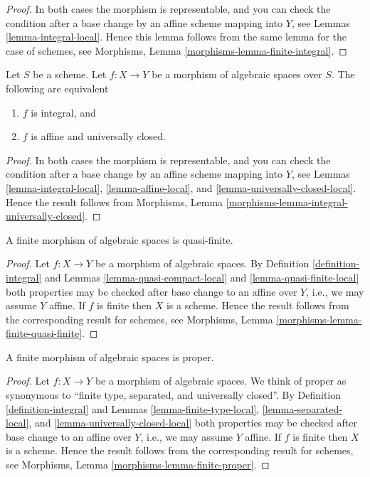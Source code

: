 \begin{proof}
In both cases the morphism is representable, and you can check the condition
after a base change by an affine scheme mapping into $Y$, see
Lemmas \ref{lemma-integral-local}. Hence this lemma follows from the
same lemma for the case of schemes, see
Morphisms, Lemma \ref{morphisms-lemma-finite-integral}.
\end{proof}

\begin{lemma}
\label{lemma-integral-universally-closed}
Let $S$ be a scheme.
Let $f : X \to Y$ be a morphism of algebraic spaces over $S$.
The following are equivalent
\begin{enumerate}
\item $f$ is integral, and
\item $f$ is affine and universally closed.
\end{enumerate}
\end{lemma}

\begin{proof}
In both cases the morphism is representable, and you can check the condition
after a base change by an affine scheme mapping into $Y$, see
Lemmas \ref{lemma-integral-local},
\ref{lemma-affine-local}, and
\ref{lemma-universally-closed-local}.
Hence the result follows from
Morphisms, Lemma \ref{morphisms-lemma-integral-universally-closed}.
\end{proof}

\begin{lemma}
\label{lemma-finite-quasi-finite}
A finite morphism of algebraic spaces is quasi-finite.
\end{lemma}

\begin{proof}
Let $f : X \to Y$ be a morphism of algebraic spaces.
By
Definition \ref{definition-integral}
and
Lemmas \ref{lemma-quasi-compact-local} and
\ref{lemma-quasi-finite-local}
both properties may be checked after base change to an affine over $Y$,
i.e., we may assume $Y$ affine.
If $f$ is finite then $X$ is a scheme.
Hence the result follows from the corresponding result for schemes, see
Morphisms, Lemma \ref{morphisms-lemma-finite-quasi-finite}.
\end{proof}

\begin{lemma}
\label{lemma-finite-proper}
A finite morphism of algebraic spaces is proper.
\end{lemma}

\begin{proof}
Let $f : X \to Y$ be a morphism of algebraic spaces.
We think of proper as synonymous to
``finite type, separated, and universally closed''.
By
Definition \ref{definition-integral}
and
Lemmas \ref{lemma-finite-type-local},
\ref{lemma-separated-local}, and
\ref{lemma-universally-closed-local}
both properties may be checked after base change to an affine over $Y$,
i.e., we may assume $Y$ affine.
If $f$ is finite then $X$ is a scheme.
Hence the result follows from the corresponding result for schemes, see
Morphisms, Lemma \ref{morphisms-lemma-finite-proper}.
\end{proof}

